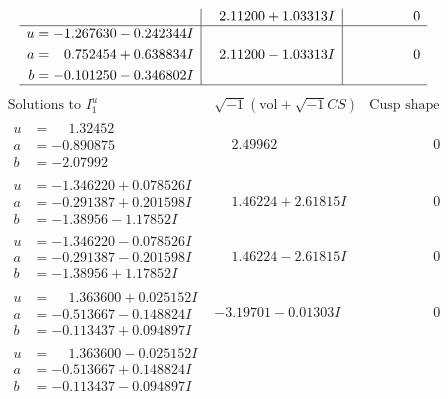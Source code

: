 \documentclass[1p]{elsarticle_modified}
\theoremstyle{definition}
\newcommand{\I}{\sqrt{-1}}
\begin{document}
$$\begin{array}{c|c|c}
 & \phantom{-}2.11200 + 1.03313 I & \phantom{-0.000000 } 0 \\ \hline\begin{aligned}
u &= -1.267630 - 0.242344 I \\
a &= \phantom{-}0.752454 + 0.638834 I \\
b &= -0.101250 - 0.346802 I\end{aligned}
 & \phantom{-}2.11200 - 1.03313 I & \phantom{-0.000000 } 0\\
 \hline 
 \end{array}$$\newpage$$\begin{array}{c|c|c}  
\text{Solutions to }I^u_{1}& \I (\text{vol} + \sqrt{-1}CS) & \text{Cusp shape}\\
 \hline 
\begin{aligned}
u &= \phantom{-}1.32452\phantom{ +0.000000I} \\
a &= -0.890875\phantom{ +0.000000I} \\
b &= -2.07992\phantom{ +0.000000I}\end{aligned}
 & \phantom{-}2.49962\phantom{ +0.000000I} & \phantom{-0.000000 } 0 \\ \hline\begin{aligned}
u &= -1.346220 + 0.078526 I \\
a &= -0.291387 + 0.201598 I \\
b &= -1.38956 - 1.17852 I\end{aligned}
 & \phantom{-}1.46224 + 2.61815 I & \phantom{-0.000000 } 0 \\ \hline\begin{aligned}
u &= -1.346220 - 0.078526 I \\
a &= -0.291387 - 0.201598 I \\
b &= -1.38956 + 1.17852 I\end{aligned}
 & \phantom{-}1.46224 - 2.61815 I & \phantom{-0.000000 } 0 \\ \hline\begin{aligned}
u &= \phantom{-}1.363600 + 0.025152 I \\
a &= -0.513667 - 0.148824 I \\
b &= -0.113437 + 0.094897 I\end{aligned}
 & -3.19701 - 0.01303 I & \phantom{-0.000000 } 0 \\ \hline\begin{aligned}
u &= \phantom{-}1.363600 - 0.025152 I \\
a &= -0.513667 + 0.148824 I \\
b &= -0.113437 - 0.094897 I\end{aligned}

\end{array}$$
\end{document}
